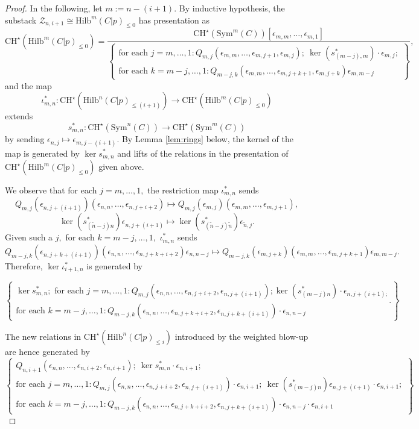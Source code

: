 \documentclass[10pt,a4paper]{amsart}
\newcommand{\CHs}{\mathrm{CH}^\star}
\newcommand{\Hilb}{\mathrm{Hilb}}
\begin{document}
\begin{proof}
  In the following, let $m:=n-(i+1).$ By inductive hypothesis, the substack $\mathcal{Z}_{n,i+1}\cong \Hilb^{m}(C|p)_{\leq 0}$ has presentation as $$\CHs(\Hilb^m(C|p)_{\le 0})=\frac{\mathrm{CH}^\star(\mathrm{Sym}^{m}(C))[\epsilon_{m,m},\dots, \epsilon_{m,1}]}{\left\{\begin{array}{c}
   \text{for each } j = m, \dots, 1: Q_{m,j}(\epsilon_{m,m},\dots,\epsilon_{m,j+1}, \epsilon_{m,j}); \  \ker(s_{(m-j),m}^*) \cdot \epsilon_{m,j};\\\text{for each } k = m-j, \dots, 1: Q_{m-j,k}(\epsilon_{m,m},\dots, \epsilon_{m,j+k+1}, \epsilon_{m,j+k})\epsilon_{m,m-j}
  \end{array}\right\}},$$ and the map $$\iota_{m,n}^*: \mathrm{CH}^\star(\Hilb^n(C|p)_{\leq (i+1)})\to \mathrm{CH}^\star(\Hilb^{m}(C|p)_{\leq 0})$$ extends $$s_{m,n}^*: \mathrm{CH}^\star(\mathrm{Sym}^n(C))\to \mathrm{CH}^\star(\mathrm{Sym}^{m}(C))$$ by sending $\epsilon_{n,j}\mapsto \epsilon_{m, j-(i+1)}.$ By Lemma \ref{lem:rings} below, the kernel of the map is generated by $\ker s_{m,n}^*$ and lifts of the relations in the presentation of $\mathrm{CH}^\star(\Hilb^{m}(C|p)_{\leq 0})$ given above.
  
  We observe that for each $j= m, \dots, 1,$ the restriction map $\iota_{m,n}^*$ sends $$Q_{m, j}(\epsilon_{n, j+(i+1)})(\epsilon_{n,n},\dots, \epsilon_{n, j+i+2})\mapsto Q_{m,j}(\epsilon_{m,j})(\epsilon_{m,m},\dots,\epsilon_{m,j+1}),$$ {$$\ker(s_{(\tilde{n}-j)n}^*)\epsilon_{n,j+(i+1)}\mapsto \ker(s_{(\tilde{n}-j)\tilde{n}}^*)\epsilon_{\tilde{n},j}.$$} 
  Given such a $j,$ for each $k = m-j,\dots, 1,$ $\iota_{m,n}^*$ sends $$Q_{m-j, k}(\epsilon_{n, j+k+(i+1)})(\epsilon_{n,n},\dots, \epsilon_{n, j+k+i+2})\epsilon_{n,n-j}\mapsto Q_{m-j,k}(\epsilon_{m,j+k})(\epsilon_{m,m},\dots, \epsilon_{m,j+k+1})\epsilon_{m,m-j}.$$ Therefore, $\ker \iota_{i+1,n}^*$ is generated by
  
$$\left\{\begin{array}{c}
    \ker s_{m,n}^*;  \text{ for each } j= m, \dots, 1:  Q_{m, j}(\epsilon_{n,n},\dots, \epsilon_{n, j+i+2}, \epsilon_{n, j+(i+1)});  \ker(s_{(m-j)n}^*)\cdot \epsilon_{n,j+(i+1);}\\
    \text{for each }k = m-j,\dots, 1:  Q_{m-j, k}(\epsilon_{n,n},\dots, \epsilon_{n, j+k+i+2}, \epsilon_{n, j+k+(i+1)}) \cdot \epsilon_{n,n-j}
  \end{array} \right\}.$$
  
  The new relations in $\mathrm{CH}^\star(\Hilb^n(C|p)_{\leq i})$ introduced by the weighted blow-up are hence generated by 
  $$\left\{\begin{array}{c}
    Q_{n,i+1}(\epsilon_{n,n},\dots, \epsilon_{n,i+2}, \epsilon_{n,i+1}); \ \ker s_{m,n}^* \cdot \epsilon_{n,i+1};
    \\
     \text{for each }j=m, \dots, 1:  Q_{m, j}(\epsilon_{n,n},\dots, \epsilon_{n, j+i+2}, \epsilon_{n, j+(i+1)})\cdot\epsilon_{n,i+1}; \  \ker(s_{(m-j)n}^*)\epsilon_{n,j+(i+1)}\cdot \epsilon_{n,i+1};\\
    \text{for each }k = m-j,\dots, 1:  Q_{m-j, k}(\epsilon_{n,n},\dots, \epsilon_{n, j+k+i+2}, \epsilon_{n, j+k+(i+1)})\cdot \epsilon_{n,n-j} \cdot \epsilon_{n,i+1}
  \end{array} \right\}$$
  

\end{proof}
\end{document}
